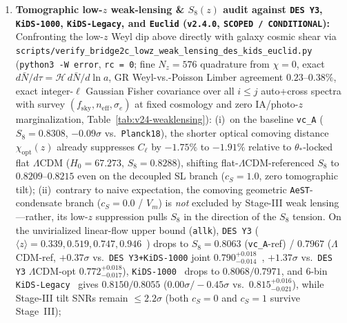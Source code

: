\documentclass[11pt,a4paper]{article}
\begin{document}
\begin{enumerate}
    (c)~an adversarial monotone-lapse control ($\bar{N}(a) = 1 - 0.015 a^{3/2}$) gives $\Delta\chi^2_{\mathrm{KK22}} = 0.00$ ($c_S = 1.0$) and $+1.12$ (\texttt{P1}) / $+0.65$ (\texttt{2F}) at $c_S = 0.0$ ($\Delta\chi^2_{\mathrm{ACT108}} = +0.05$, $\Delta\chi^2_{\mathrm{KK13}} = -0.02$).
    \item \textbf{Tomographic low-$z$ weak-lensing \& $S_8(z)$ audit against \texttt{DES Y3}, \texttt{KiDS-1000}, \texttt{KiDS-Legacy}, and \texttt{Euclid} (\texttt{v2.4.0}, \texttt{SCOPED / CONDITIONAL}):}
    Confronting the low-$z$ Weyl dip above directly with galaxy cosmic shear via \texttt{scripts/\allowbreak verify\_\allowbreak bridge2c\_\allowbreak lowz\_\allowbreak weak\_\allowbreak lensing\_\allowbreak des\_\allowbreak kids\_\allowbreak euclid.py} (\texttt{python3 -W error}, \texttt{rc = 0}; fine $N_z = 576$ quadrature from $\chi = 0$, exact $d\bar{N}/d\tau = \mathcal{H}\,d\bar{N}/d\ln a$, GR Weyl-vs.-Poisson Limber agreement $0.23\text{--}0.38\%$, exact integer-$\ell$ Gaussian Fisher covariance over all $i \le j$ auto+cross spectra with survey $(f_{\mathrm{sky}}, n_{\mathrm{eff}}, \sigma_e)$ at fixed cosmology and zero IA/photo-$z$ marginalization, Table~\ref{tab:v24-weaklensing}):
    (i)~on the baseline \texttt{vc\_A} ($S_8 = 0.8308$, $-0.09\sigma$ vs.\ \texttt{Planck18}), the shorter optical comoving distance $\chi_{\mathrm{opt}}(z)$ already suppresses $C_\ell$ by $-1.75\%$ to $-1.91\%$ relative to $\theta_*$-locked flat $\Lambda$CDM ($H_0 = 67.273$, $S_8 = 0.8288$), shifting flat-$\Lambda$CDM-referenced $S_8$ to $0.8209\text{--}0.8215$ even on the decoupled SL branch ($c_S = 1.0$, zero tomographic tilt);
    (ii)~contrary to naive expectation, the comoving geometric \texttt{AeST}-condensate branch ($c_S = 0.0$ / $V_m$) is \emph{not} excluded by Stage-III weak lensing---rather, its low-$z$ suppression pulls $S_8$ in the direction of the $S_8$ tension. On the unvirialized linear-flow upper bound (\texttt{allk}), \texttt{DES Y3} ($\langle z \rangle = 0.339, 0.519, 0.747, 0.946$~\cite{Amon2022}) drops to $S_8 = 0.8063$ (\texttt{vc\_A}-ref) / $0.7967$ ($\Lambda$CDM-ref, $+0.37\sigma$ vs.\ \texttt{DES Y3+KiDS-1000} joint $0.790^{+0.018}_{-0.014}$~\cite{Abbott2023}, $+1.37\sigma$ vs.\ \texttt{DES Y3} $\Lambda$CDM-opt $0.772^{+0.018}_{-0.017}$), \texttt{KiDS-1000}~\cite{Asgari2021} drops to $0.8068 / 0.7971$, and 6-bin \texttt{KiDS-Legacy}~\cite{Wright2025} gives $0.8150 / 0.8055$ ($0.00\sigma / -0.45\sigma$ vs.\ $0.815^{+0.016}_{-0.021}$), while Stage-III tilt SNRs remain $\le 2.2\sigma$ (both $c_S = 0$ and $c_S = 1$ survive Stage~III);

\end{enumerate}
\end{document}
